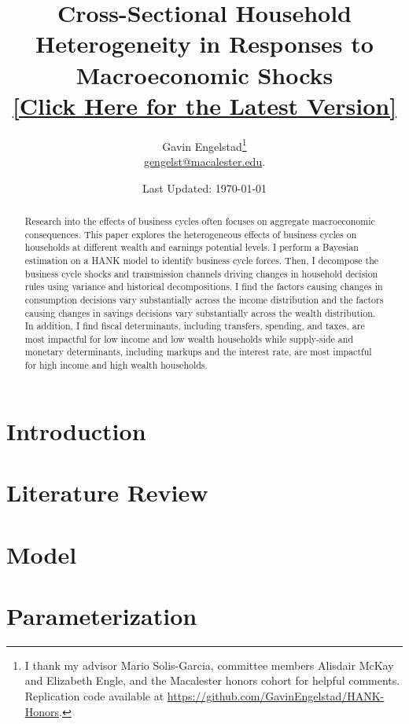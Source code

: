 \documentclass[11pt]{article}
\title{Cross-Sectional Household Heterogeneity in Responses to Macroeconomic Shocks \\ {\large \href{https://gavinengelstad.github.io/assets/pdf/hank/paper.pdf}{[Click Here for the Latest Version]}}}
\author{Gavin Engelstad\thanks{I thank my advisor Mario Solis-Garcia, committee members Alisdair McKay and Elizabeth Engle, and the Macalester honors cohort for helpful comments. Replication code available at \url{https://github.com/GavinEngelstad/HANK-Honors}.} \\ \href{mailto:gengelst@macalester.edu}{gengelst@macalester.edu}.}
\date{Last Updated: \today}
\numberwithin{equation}{section} %
\numberwithin{figure}{section} %
\numberwithin{table}{section} %
\begin{document}
\maketitle

\begin{abstract}
  Research into the effects of business cycles often focuses on aggregate macroeconomic consequences. This paper explores the heterogeneous effects of business cycles on households at different wealth and earnings potential levels. I perform a Bayesian estimation on a HANK model to identify business cycle forces. Then, I decompose the business cycle shocks and transmission channels driving changes in household decision rules using variance and historical decompositions. I find the factors causing changes in consumption decisions vary substantially across the income distribution and the factors causing changes in savings decisions vary substantially across the wealth distribution. In addition, I find fiscal determinants, including transfers, spending, and taxes, are most impactful for low income and low wealth households while supply-side and monetary determinants, including markups and the interest rate, are most impactful for high income and high wealth households.


\end{abstract}
\newpage

\section{Introduction} \label{sec:intro}


\section{Literature Review} \label{sec:lit-review}


\section{Model}
 \label{sec:model}

\section{Parameterization} \label{sec:params}

\end{document}
